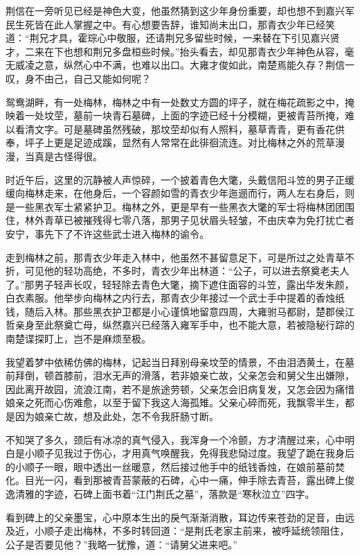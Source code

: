 荆信在一旁听见已经是神色大变，他虽然猜到这少年身份重要，却也想不到嘉兴军民生死皆在此人掌握之中。有心想要告辞，谁知尚未出口，那青衣少年已经笑道：“荆兄才具，霍琮心中敬服，还请荆兄多留些时候，一来替在下引见嘉兴贤才，二来在下也想和荆兄多盘桓些时候。”抬头看去，却见那青衣少年神色从容，毫无威凌之意，纵然心中不满，也难以出口。大雍才俊如此，南楚焉能久存？荆信一叹，身不由己，自己又能如何呢？

鸳鸯湖畔，有一处梅林，梅林之中有一处数丈方圆的坪子，就在梅花疏影之中，掩映着一处坟茔，墓前一块青石墓碑，上面的字迹已经十分模糊，更被青苔所掩，难以看清文字。可是墓碑虽然残破，那坟茔却似有人照料，墓草青青，更有香花供奉，坪子上更是足迹成蹊，显然有人常常在此徘徊流连。对比梅林之外的荒草漫漫，当真是古怪得很。

时近午后，这里的沉静被人声惊碎，一个披着青色大氅，头戴信阳斗笠的男子正缓缓向梅林走来，在他身后，一个容颜如雪的青衣少年迤逦而行，两人左右身后，则是一些黑衣军士紧紧护卫。梅林之外，更是早有一些黑衣大氅的军士将梅林团团围住，林外青草已被摧残得七零八落，那男子见状眉头轻皱，不由庆幸为免打扰亡者安宁，事先下了不许这些武士进入梅林的谕令。

走到梅林之前，那青衣少年走入林中，他虽然不甚留意足下，可是所过之处青草不折，可见他的轻功高绝，不多时，青衣少年出林道：“公子，可以进去祭奠老夫人了。”那男子轻声长叹，轻轻除去青色大氅，摘下遮住面容的斗笠，露出华发朱颜，白衣素服。他举步向梅林之内行去，那青衣少年接过一个武士手中提着的香烛纸钱，随后入林。那些黑衣护卫都是小心谨慎地留意四周，大雍驸马都尉，楚郡侯江哲亲身至此祭奠亡母，纵然嘉兴已经落入雍军手中，也不能大意，若被隐秘行踪的南楚谍探盯上，岂不是麻烦至极。

我望着梦中依稀仿佛的梅林，记起当日拜别母亲坟茔的情景，不由泪洒黄土，在墓前拜倒，顿首膝前，泪水无声的滑落，若非娘亲亡故，父亲怎会和舅父生出嫌隙，因此离开故园，流浪江南，若不是旅途劳顿，父亲怎会旧病复发，又怎会因为痛惜娘亲之死而心伤难愈，以至于留下我这人海孤雉。父亲心碎而死，我飘零半生，都是因为娘亲亡故，想及此处，怎不令我肝肠寸断。

不知哭了多久，颈后有冰凉的真气侵入，我浑身一个冷颤，方才清醒过来，心中明白是小顺子见我过于伤心，才用真气唤醒我，免得我悲恸过度。我望了跪在我身后的小顺子一眼，眼中透出一丝暖意，然后接过他手中的纸钱香烛，在娘前墓前焚化。目光一闪，看到那被青苔蒙蔽的石碑，心中一痛，伸手除去青苔，露出碑上俊逸清雅的字迹，石碑上面书着“江门荆氏之墓”，落款是“寒秋泣立”四字。

看到碑上的父亲墨宝，心中原本生出的戾气渐渐消散，耳边传来苍劲的足音，由远及近，小顺子走出梅林，不多时转回道：“是荆氏老家主前来，被呼延统领阻住，公子是否要见他？”我略一犹豫，道：“请舅父进来吧。”

